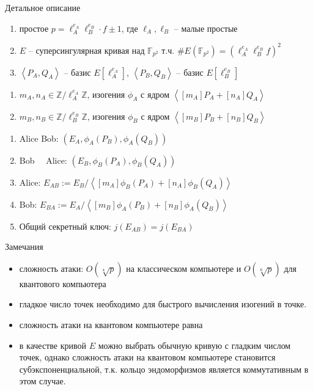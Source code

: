 \documentclass{beamer}
\begin{document}
\begin{frame}{Детальное описание}
    \begin{enumerate}
        \item простое
        $p = \ell_A^{e_A} \ell_B^{e_B} \cdot f \pm 1$, где $\ell_A, \ell_B$ -- малые простые
        \item $E$ -- суперсингулярная кривая над $\mathbb{F}_{p^2}$ т.ч. $\#E(\mathbb{F}_{p^2}) = (\ell_A^{e_A} \ell_{B}^{e_B} f)^2$
        \item $\left<P_A, Q_A\right>$ -- базис $E[\ell_A^{e_A}]$, $\left<P_B, Q_B\right>$ -- базис $E[\ell_B^{e_B}]$
    \end{enumerate}
    \begin{enumerate}
        \item {} $m_A, n_A \in \mathbb{Z}/\ell_A^{e_A} \mathbb{Z}$, изогения $\phi_A$ с ядром $\left< [m_A]P_A + [n_A]Q_A \right>$
        \item {} $m_B, n_B \in \mathbb{Z}/\ell_B^{e_B} \mathbb{Z}$, изогения $\phi_B$ с ядром $\left< [m_B]P_B + [n_B]Q_B \right>$
    \end{enumerate}
\end{frame}

\begin{frame}
    \begin{enumerate}
        \item
        Alice \structure{$\implies$} Bob: $(E_A, \phi_A(P_B), \phi_A(Q_B))$
        \item
        Bob~~ \structure{$\implies$} Alice: $(E_B, \phi_B(P_A), \phi_B(Q_A))$
        \item Alice: $E_{AB} := E_B/\left< [m_A]\phi_B(P_A) + [n_A]\phi_B(Q_A) \right>$
        \item Bob: $E_{BA} := E_A/\left< [m_B]\phi_A(P_B) + [n_B]\phi_A(Q_B) \right>$
        \item Общий секретный ключ: $j(E_{AB}) = j(E_{BA})$
    \end{enumerate}
\end{frame}

\begin{frame}{Замечания}
    \begin{itemize}
        \item сложность атаки: $O(\sqrt[4]{p})$ на классическом компьютере и $O(\sqrt[6]{p})$ для квантового компьютера
        \item гладкое число точек необходимо для быстрого вычисления изогений в точке.
        \item сложность атаки на квантовом компьютере равна
        \item в качестве кривой $E$ можно выбрать обычную кривую с гладким числом точек, однако сложность атаки на квантовом компьютере становится субэкспоненциальной, т.к. кольцо эндоморфизмов является коммутативным в этом случае.
    \end{itemize}
\end{frame}
\end{document}
